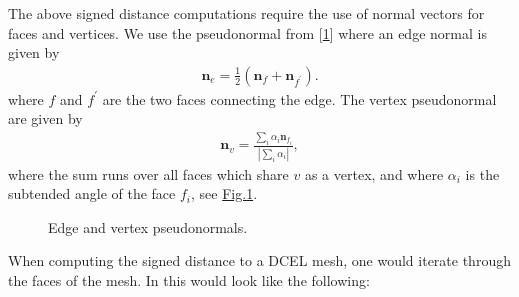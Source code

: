 \documentclass[letterpaper,10pt,english]{sphinxmanual}
\let\sphinxpxdimen\pdfpxdimen\else\newdimen\sphinxpxdimen
\begin{document}
The above signed distance computations require the use of normal vectors for faces and vertices.
We use the pseudonormal from {[}\hyperlink{cite.ZZReferences:id162}{1}{]} where an edge normal is given by
\begin{equation*}
\begin{split}\mathbf{n}_{e} = \frac{1}{2}\left(\mathbf{n}_{f} + \mathbf{n}_{f^\prime}\right).\end{split}
\end{equation*}
where \(f\) and \(f^\prime\) are the two faces connecting the edge.
The vertex pseudonormal are given by
\begin{equation*}
\begin{split}\mathbf{n}_{v} = \frac{\sum_i\alpha_i\mathbf{n}_{f_i}}{\left|\sum_i\alpha_i\right|},\end{split}
\end{equation*}
where the sum runs over all faces which share \(v\) as a vertex, and where \(\alpha_i\) is the subtended angle of the face \(f_i\), see \hyperref[\detokenize{Utilities/ComplexGeometries:fig-pseudonormal}]{Fig.\@ \ref{\detokenize{Utilities/ComplexGeometries:fig-pseudonormal}}}.

\begin{figure}[htb]
\centering
\capstart

\noindent\sphinxincludegraphics[width=240\sphinxpxdimen]{{Pseudonormal}.png}
\caption{Edge and vertex pseudonormals.}\label{\detokenize{Utilities/ComplexGeometries:id4}}\label{\detokenize{Utilities/ComplexGeometries:fig-pseudonormal}}\end{figure}

When computing the signed distance to a DCEL mesh, one would iterate through the faces of the mesh.
In  this would look like the following:
\end{document}
